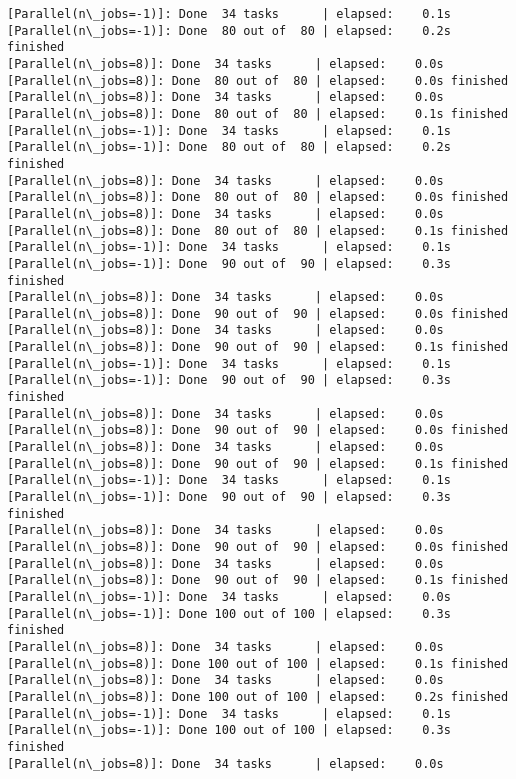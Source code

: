 \documentclass[11pt]{article}
\begin{document}
\begin{Verbatim}[commandchars=\\\{\}]
[Parallel(n\_jobs=-1)]: Done  34 tasks      | elapsed:    0.1s
[Parallel(n\_jobs=-1)]: Done  80 out of  80 | elapsed:    0.2s finished
[Parallel(n\_jobs=8)]: Done  34 tasks      | elapsed:    0.0s
[Parallel(n\_jobs=8)]: Done  80 out of  80 | elapsed:    0.0s finished
[Parallel(n\_jobs=8)]: Done  34 tasks      | elapsed:    0.0s
[Parallel(n\_jobs=8)]: Done  80 out of  80 | elapsed:    0.1s finished
[Parallel(n\_jobs=-1)]: Done  34 tasks      | elapsed:    0.1s
[Parallel(n\_jobs=-1)]: Done  80 out of  80 | elapsed:    0.2s finished
[Parallel(n\_jobs=8)]: Done  34 tasks      | elapsed:    0.0s
[Parallel(n\_jobs=8)]: Done  80 out of  80 | elapsed:    0.0s finished
[Parallel(n\_jobs=8)]: Done  34 tasks      | elapsed:    0.0s
[Parallel(n\_jobs=8)]: Done  80 out of  80 | elapsed:    0.1s finished
[Parallel(n\_jobs=-1)]: Done  34 tasks      | elapsed:    0.1s
[Parallel(n\_jobs=-1)]: Done  90 out of  90 | elapsed:    0.3s finished
[Parallel(n\_jobs=8)]: Done  34 tasks      | elapsed:    0.0s
[Parallel(n\_jobs=8)]: Done  90 out of  90 | elapsed:    0.0s finished
[Parallel(n\_jobs=8)]: Done  34 tasks      | elapsed:    0.0s
[Parallel(n\_jobs=8)]: Done  90 out of  90 | elapsed:    0.1s finished
[Parallel(n\_jobs=-1)]: Done  34 tasks      | elapsed:    0.1s
[Parallel(n\_jobs=-1)]: Done  90 out of  90 | elapsed:    0.3s finished
[Parallel(n\_jobs=8)]: Done  34 tasks      | elapsed:    0.0s
[Parallel(n\_jobs=8)]: Done  90 out of  90 | elapsed:    0.0s finished
[Parallel(n\_jobs=8)]: Done  34 tasks      | elapsed:    0.0s
[Parallel(n\_jobs=8)]: Done  90 out of  90 | elapsed:    0.1s finished
[Parallel(n\_jobs=-1)]: Done  34 tasks      | elapsed:    0.1s
[Parallel(n\_jobs=-1)]: Done  90 out of  90 | elapsed:    0.3s finished
[Parallel(n\_jobs=8)]: Done  34 tasks      | elapsed:    0.0s
[Parallel(n\_jobs=8)]: Done  90 out of  90 | elapsed:    0.0s finished
[Parallel(n\_jobs=8)]: Done  34 tasks      | elapsed:    0.0s
[Parallel(n\_jobs=8)]: Done  90 out of  90 | elapsed:    0.1s finished
[Parallel(n\_jobs=-1)]: Done  34 tasks      | elapsed:    0.0s
[Parallel(n\_jobs=-1)]: Done 100 out of 100 | elapsed:    0.3s finished
[Parallel(n\_jobs=8)]: Done  34 tasks      | elapsed:    0.0s
[Parallel(n\_jobs=8)]: Done 100 out of 100 | elapsed:    0.1s finished
[Parallel(n\_jobs=8)]: Done  34 tasks      | elapsed:    0.0s
[Parallel(n\_jobs=8)]: Done 100 out of 100 | elapsed:    0.2s finished
[Parallel(n\_jobs=-1)]: Done  34 tasks      | elapsed:    0.1s
[Parallel(n\_jobs=-1)]: Done 100 out of 100 | elapsed:    0.3s finished
[Parallel(n\_jobs=8)]: Done  34 tasks      | elapsed:    0.0s

\end{Verbatim}
\end{document}
